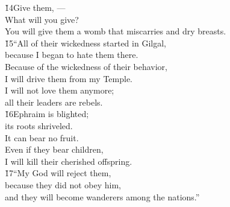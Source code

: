 \begin{poetry}
\poeml \v{14}Give them, --- \\
\poemll    What will you give? \\
\poemlll       You will give them a womb that miscarries and dry breasts. \\
\poeml \v{15}``All of their wickedness started in Gilgal, \\
\poemll    because I began to hate them there. \\
\poeml Because of the wickedness of their behavior, \\
\poemll    I will drive them from my Temple. \\
\poeml I will not love them anymore; \\
\poemll    all their leaders are rebels. \\
\poeml \v{16}Ephraim is blighted; \\
\poemll    its roots shriveled. \\
\poemlll       It can bear no fruit. \\
\poeml Even if they bear children, \\
\poemll    I will kill their cherished offspring. \\
\poeml \v{17}``My God will reject them, \\
\poemll    because they did not obey him, \\
\poemlll       and they will become wanderers among the nations.''
\end{poetry}

